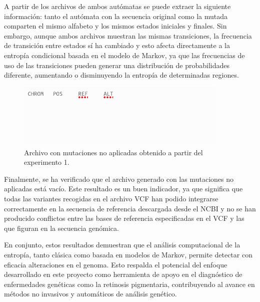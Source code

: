 \documentclass[11pt,spanish,listoffigures,listoftables]{tfgetsinf}
\begin{document}
A partir de los archivos de ambos autómatas se puede extraer la siguiente información: tanto el autómata con la secuencia original como la mutada comparten el mismo alfabeto y los mismos estados iniciales y finales. Sin embargo, aunque ambos archivos muestran las mismas transiciones, la frecuencia de transición entre estados sí ha cambiado y esto afecta directamente a la entropía condicional basada en el modelo de Markov, ya que las frecuencias de uso de las transiciones pueden generar una distribución de probabilidades diferente, aumentando o disminuyendo la entropía de determinadas regiones. 

\begin{figure}[H]
      \centering
      \includegraphics[width=0.9\textwidth]{mut_exp1.png}
      \caption{Archivo con mutaciones no aplicadas obtenido a partir del experimento 1.}
      \label{fig:etiqueta_opcional14}
\end{figure}


Finalmente, se ha verificado que el archivo generado con las mutaciones no aplicadas está vacío. Este resultado es un buen indicador, ya que significa que todas las variantes recogidas en el archivo VCF han podido integrarse correctamente en la secuencia de referencia descargada desde el NCBI y no se han producido conflictos entre las bases de referencia especificadas en el VCF y las que figuran en la secuencia genómica. 

En conjunto, estos resultados demuestran que el análisis computacional de la entropía, tanto clásica como basada en modelos de Markov, permite detectar con eficacia alteraciones en el genoma. Esto respalda el potencial del enfoque desarrollado en este proyecto como herramienta de apoyo en el diagnóstico de enfermedades genéticas como la retinosis pigmentaria, contribuyendo al avance en métodos no invasivos y automáticos de análisis genético. 



\end{document}
